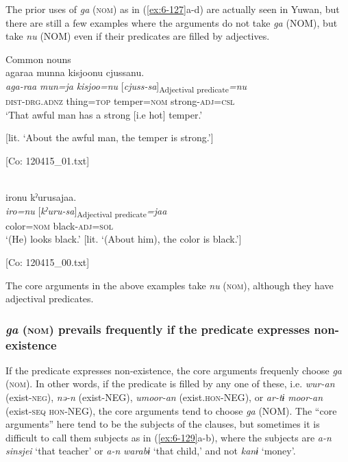 \begin{table}
\begin{styleBeschriftung}
The prior uses of \textit{ga} (\textsc{nom}) as in (\ref{ex:6-127}a-d) are actually seen in Yuwan, but there are still a few examples where the arguments do not take \textit{ga} (NOM), but take \textit{nu} (NOM) even if their predicates are filled by adjectives.

\ea\label{ex:6-128}
 Common nouns\\

 \ea {\TM}  agaraa  munna  kisjoonu  cjussanu.\\
\glll \textit{aga-raa}  \textit{mun=ja}  \textit{kisjoo=nu}  [\textit{cjuss-sa}]\textsubscript{Adjectival predicate}\textit{=nu}\\
\textsc{dist}-\textsc{drg}.\textsc{adnz}  thing=\textsc{top}  temper=\textsc{nom}  strong-\textsc{adj}=\textsc{csl}\\
\glt ‘That awful man has a strong [i.e hot] temper.’

[lit. ‘About the awful man, the temper is strong.’]

      [Co: 120415\_01.txt]
\z

\ex{}\\
{\TM}
\glll  {\textbar}iro{\textbar}nu  kˀurusajaa.\\
\textit{iro=nu}  [\textit{kˀuru-sa}]\textsubscript{Adjectival predicate}\textit{=jaa}\\
color=\textsc{nom}  black-\textsc{adj}=\textsc{sol}\\
\glt ‘(He) looks black.’ [lit. ‘(About him), the color is black.’]

      [Co: 120415\_00.txt]
\z

The core arguments in the above examples take \textit{nu} (\textsc{nom}), although they have adjectival predicates.

\subsubsection{\textit{ga} (\textsc{nom}) prevails frequently if the predicate expresses non-existence}

If the predicate expresses non-existence, the core arguments frequenly choose \textit{ga} (\textsc{nom}). In other words, if the predicate is filled by any one of these, i.e. \textit{wur-an} (exist-\textsc{neg}), \textit{nə-n} (exist-NEG), \textit{umoor-an} (exist.\textsc{hon}-NEG), or \textit{ar-tɨ} \textit{moor-an} (exist-\textsc{seq} \textsc{hon}-NEG), the core arguments tend to choose \textit{ga} (NOM). The “core arguments” here tend to be the subjects of the clauses, but sometimes it is difficult to call them subjects as in (\ref{ex:6-129}a-b), where the subjects are \textit{a-n} \textit{sinsjei} ‘that teacher’ or \textit{a-n} \textit{warabɨ} ‘that child,’ and not \textit{kanɨ} ‘money’.


\end{styleBeschriftung}
\end{table}

